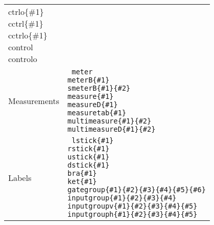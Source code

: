 \documentclass[twocolumn,nofootinbib]{revtex4}
\begin{document}
{\begin{center}
\begin{tabular}{l | l }
{                    \char92 ctrlo\{\#1\} \\
                    \char92 cctrl\{\#1\} \\
                    \char92 cctrlo\{\#1\} \\
                    \char92 control \\
                    \char92 controlo } \\
        Measurements & \parbox[t]{6cm}{\tt
                     meter \\
                     meterB\{\#1\} \\
                     smeterB\{\#1\}\{\#2\} \\
                     measure\{\#1\} \\
                     measureD\{\#1\} \\
                     measuretab\{\#1\} \\
                     multimeasure\{\#1\}\{\#2\} \\
                     multimeasureD\{\#1\}\{\#2\} } \\
        Labels & \parbox[t]{6cm}{\tt
                     lstick\{\#1\} \\
                     rstick\{\#1\} \\
                     ustick\{\#1\} \\
                     dstick\{\#1\} \\
                     bra\{\#1\} \\
                     ket\{\#1\} \\
                     gategroup\{\#1\}\{\#2\}\{\#3\}\{\#4\}\{\#5\}\{\#6\}\\
                     inputgroup\{\#1\}\{\#2\}\{\#3\}\{\#4\}\\
                     inputgroupv\{\#1\}\{\#2\}\{\#3\}\{\#4\}\{\#5\}\\
                     inputgrouph\{\#1\}\{\#2\}\{\#3\}\{\#4\}\{\#5\}\\
                    }
    \end{tabular}
\end{center}}
\end{document}
